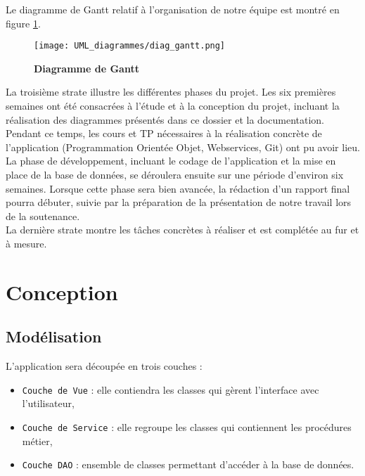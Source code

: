 \documentclass[11pt]{article}
\begin{document}
\bigbreak

Le diagramme de Gantt relatif à l'organisation de notre équipe est montré en figure \ref{UML_gantt}.\\


\begin{figure}[H]
    \caption{\textbf{Diagramme de Gantt}}
    \label{UML_gantt}
    \centering
    \texttt{[image: UML\_diagrammes/diag\_gantt.png]}
\end{figure}

La troisième strate illustre les différentes phases du projet. Les six premières semaines ont été consacrées à l'étude et à la conception du projet, incluant la réalisation des diagrammes présentés dans ce dossier et la documentation. Pendant ce temps, les cours et TP nécessaires à la réalisation concrète de l'application (Programmation Orientée Objet, Webservices, Git) ont pu avoir lieu. La phase de développement, incluant le codage de l'application et la mise en place de la base de données, se déroulera ensuite sur une période d'environ six semaines. Lorsque cette phase sera bien avancée, la rédaction d'un rapport final pourra débuter, suivie par la préparation de la présentation de notre travail lors de la soutenance.\\

La dernière strate montre les tâches concrètes à réaliser et est complétée au fur et à mesure.\\






\newpage
\section{Conception}

\subsection{Modélisation}

L'application sera découpée en trois couches :
\begin{itemize}
    \item \texttt{Couche de Vue} : elle contiendra les classes qui gèrent l'interface avec l'utilisateur,
    \item \texttt{Couche de Service} : elle regroupe les classes qui contiennent les procédures métier,
    \item \texttt{Couche DAO} : ensemble de classes permettant d'accéder à la base de données.
\end{itemize}
\end{document}
